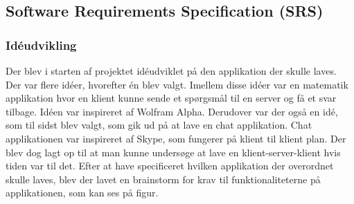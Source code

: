 \subsection{Software Requirements Specification (SRS)}

\subsubsection{Idéudvikling}
Der blev i starten af projektet idéudviklet på den applikation der skulle laves. Der var flere idéer, hvorefter én blev valgt. Imellem disse idéer var en matematik applikation hvor en klient kunne sende et spørgsmål til en server og få et svar tilbage. Idéen var inspireret af Wolfram Alpha. Derudover var der også en idé, som til sidst blev valgt, som gik ud på at lave en chat applikation. Chat applikationen var inspireret af Skype, som fungerer på klient til klient plan. Der blev dog lagt op til at man kunne undersøge at lave en klient-server-klient hvis tiden var til det.
\hfill \break
Efter at have specificeret hvilken applikation der overordnet skulle laves, blev der lavet en brainstorm for krav til funktionaliteterne på applikationen, som kan ses på figur. 
